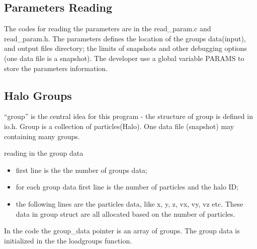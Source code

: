 \documentclass[notheorems, aspectratio=54]{beamer}
\begin{document}
\subsection{Parameters Reading}
\begin{frame}

The codes for reading the parameters are in the read\_param.c and read\_param.h. The parameters defines
the location of the groups data(input), and output files directory; the limits of snapshots 
and other debugging options (one data file is a snapshot). The developer use a global variable PARAMS to store 
the parameters information. 

\end{frame}



\subsection{Halo Groups}
\begin{frame}

``group'' is the central idea for this program - the structure of group is defined in io.h. Group is a collection of particles(Halo). One data file (snapshot)
may containing many groups.

\begin{block}{reading in the group data}
 \begin{itemize}
  \item first line is the the number of groups data;
  \item for each group data first line is the number of particles and the halo ID;
  \item the following lines are the particles data, like  x, y, z, vx, vy, vz etc. These data in group struct are all allocated based on the number of particles.
 \end{itemize}
\end{block}


In the code the group\_data pointer is an array of groups. The group data is initialized in the  the loadgroups function.

\end{frame}
\end{document}
